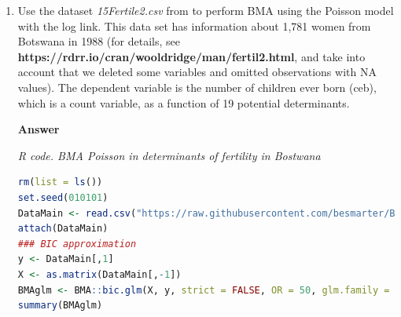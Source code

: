 \begin{enumerate}[leftmargin=*]
\textbf{Answer}

\begin{tcolorbox}[enhanced,width=4.67in,center upper,
	fontupper=\large\bfseries,drop shadow southwest,sharp corners]
	\textit{R code. BMA gamma in market value of soccer players in Europe}
	\begin{VF}
		\begin{lstlisting}[language=R]
rm(list = ls())
set.seed(010101)
DataMain <- read.csv("https://raw.githubusercontent.com/besmarter/BSTApp/refs/heads/master/DataApp/14ValueFootballPlayers.csv", sep = ",", header = TRUE, quote = "")
attach(DataMain)
### BIC approximation
y <- DataMain[,1]
X <- as.matrix(DataMain[,-1])
BMAglm <- BMA::bic.glm(X, y, strict = FALSE, OR = 50, glm.family = Gamma(link="log"))
summary(BMAglm)
\end{lstlisting}
	\end{VF}
\end{tcolorbox} 

The results show that performance, age, squared age, participation in national team, scored goals, and appearance in the UEFA champions league have PIPs equal 1. All these variables increase the market value of soccer players, except squared age.  

\item Use the dataset \textit{15Fertile2.csv} from \cite[p.~547]{Wooldridge2012} to perform BMA using the Poisson model with the log link. This data set has information about 1,781 women from Botswana in 1988 (for details, see \textbf{https://rdrr.io/cran/wooldridge/man/fertil2.html}, and take into account that we deleted some variables and omitted observations with NA values). The dependent variable is the number of children ever born (ceb), which is a count variable, as a function of 19 potential determinants.

\textbf{Answer}

\begin{tcolorbox}[enhanced,width=4.67in,center upper,
	fontupper=\large\bfseries,drop shadow southwest,sharp corners]
	\textit{R code. BMA Poisson in determinants of fertility in Bostwana}
	\begin{VF}
		\begin{lstlisting}[language=R]
rm(list = ls())
set.seed(010101)
DataMain <- read.csv("https://raw.githubusercontent.com/besmarter/BSTApp/refs/heads/master/DataApp/15Fertil2.csv", sep = ",", header = TRUE, quote = "")
attach(DataMain)
### BIC approximation
y <- DataMain[,1]
X <- as.matrix(DataMain[,-1])
BMAglm <- BMA::bic.glm(X, y, strict = FALSE, OR = 50, glm.family = poisson(link="log"))
summary(BMAglm)
\end{lstlisting}
	\end{VF}
\end{tcolorbox} 



\end{enumerate}
